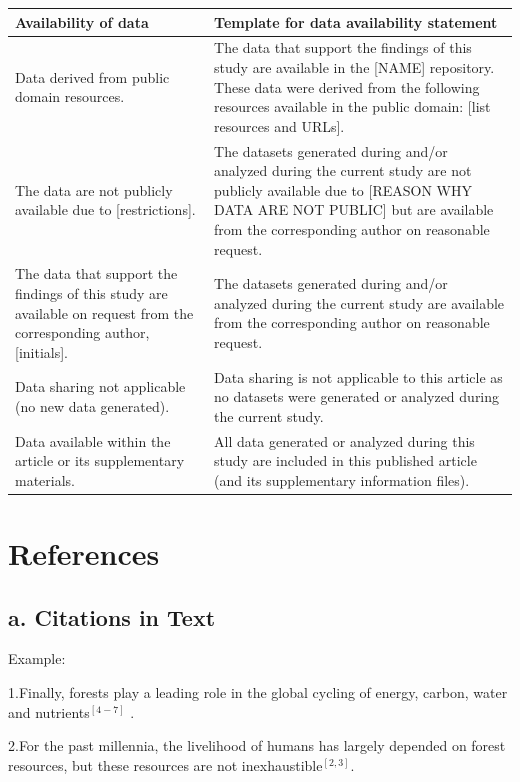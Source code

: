 \documentclass[12pt,a4paper]{article}
\begin{document}
\begin{center}
\renewcommand{\arraystretch}{1.5}
\setlength{\tabcolsep}{6pt}
\begin{tabularx}{\textwidth}{|p{}|X|}
\hline
\textbf{Availability of data} & \textbf{Template for data availability statement} \\
\hline
Data derived from public domain resources. & The data that support the findings of this study are available in the [NAME] repository. These data were derived from the following resources available in the public domain: [list resources and URLs]. \\
\hline
The data are not publicly available due to [restrictions]. & The datasets generated during and/or analyzed during the current study are not publicly available due to [REASON WHY DATA ARE NOT PUBLIC] but are available from the corresponding author on reasonable request. \\
\hline
The data that support the findings of this study are available on request from the corresponding author, [initials]. & The datasets generated during and/or analyzed during the current study are available from the corresponding author on reasonable request. \\
\hline
Data sharing not applicable (no new data generated). & Data sharing is not applicable to this article as no datasets were generated or analyzed during the current study. \\
\hline
Data available within the article or its supplementary materials. & All data generated or analyzed during this study are included in this published article (and its supplementary information files). \\
\hline
\end{tabularx}
\end{center}

\section{References}

\subsection*{a. Citations in Text}
Example:

1.Finally, forests play a leading role in the global cycling of energy, carbon, water and nutrients$^{[4-7]}$ .

2.For the past millennia, the livelihood of humans has largely depended on forest resources, but these resources are not inexhaustible$^{[2,3]}$.
\end{document}
